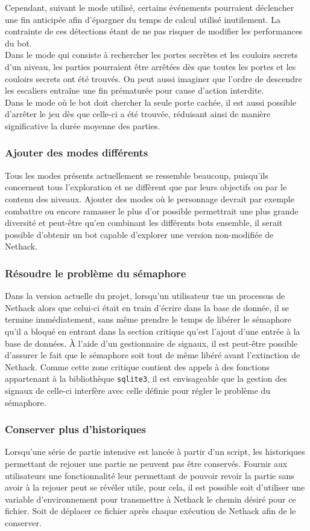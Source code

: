 \documentclass[a4paper,12pt]{article}
\begin{document}
Cependant, suivant le mode utilisé, certains événements pourraient déclencher
une fin anticipée afin d'épargner du temps de calcul utilisé inutilement. La
contrainte de ces détections étant de ne pas risquer de modifier les
performances du bot.
\\
Dans le mode qui consiste à rechercher les portes secrètes et les couloirs
secrets d'un niveau, les parties pourraient être arrêtées dès que toutes les
portes et les couloirs secrets ont été trouvés. On peut aussi imaginer que
l'ordre de descendre les escaliers entraîne une fin prématurée pour cause
d'action interdite.
\\
Dans le mode où le bot doit chercher la seule porte cachée, il est aussi
possible d'arrêter le jeu dès que celle-ci a été trouvée, réduisant ainsi de
manière significative la durée moyenne des parties.

\subsubsection{Ajouter des modes différents}
Tous les modes présents actuellement se ressemble beaucoup, puisqu'ils
concernent tous l'exploration et ne diffèrent que par leurs objectifs ou par le
contenu des niveaux. Ajouter des modes où le personnage devrait par exemple
combattre ou encore ramasser le plus d'or possible permettrait une plus grande
diversité et peut-être qu'en combinant les différents bots ensemble, il serait
possible d'obtenir un bot capable d'explorer une version non-modifiée de
Nethack.

\subsubsection{Résoudre le problème du sémaphore}
Dans la version actuelle du projet, lorsqu'un utilisateur tue un processus de
Nethack alors que celui-ci était en train d'écrire dans la base de donnée, il se
termine immédiatement, sans même prendre le temps de libérer le sémaphore qu'il
a bloqué en entrant dans la section critique qu'est l'ajout d'une entrée à la
base de données. À l'aide d'un gestionnaire de signaux, il est peut-être
possible d'assurer le fait que le sémaphore soit tout de même libéré avant
l'extinction de Nethack. Comme cette zone critique contient des appels à des
fonctions appartenant à la bibliothèque {\verb|sqlite3|}, il est envisageable
que la gestion des signaux de celle-ci interfère avec celle définie pour régler
le problème du sémaphore.

\subsubsection{Conserver plus d'historiques}
Lorsqu'une série de partie intensive est lancée à partir d'un script, les
historiques permettant de rejouer une partie ne peuvent pas être conservés.
Fournir aux utilisateurs une fonctionnalité leur permettant de pouvoir revoir la
partie sans avoir à la rejouer peut se révéler utile, pour cela, il est possible
soit d'utiliser une variable d'environnement pour transmettre à Nethack le
chemin désiré pour ce fichier. Soit de déplacer ce fichier après chaque
exécution de Nethack afin de le conserver.
\end{document}
